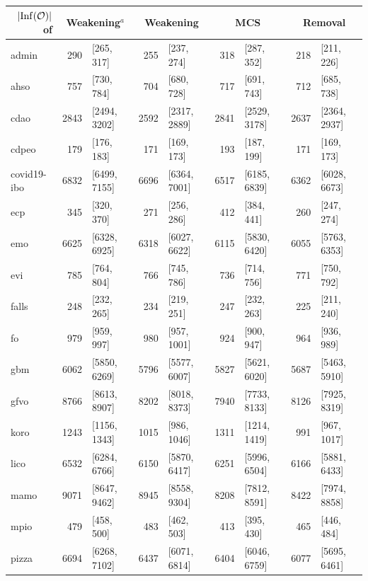 \begin{table}[htbp]
  \scriptsize
  \centering
  \begin{tabular}{|l|r@{ }lr@{ }lr@{ }lr@{ }l|}
    \cline{2-9}
    \multicolumn{1}{r|}{$|{\operatorname{Inf}}(\mathcal{O})|$ of} & \multicolumn{2}{c}{Weakening$^a$} & \multicolumn{2}{c}{Weakening} & \multicolumn{2}{c}{MCS} & \multicolumn{2}{c|}{Removal} \\
    \hline
    admin & 290 & [265, 317] & 255 & [237, 274] & 318 & [287, 352] & 218 & [211, 226] \\
    ahso & 757 & [730, 784] & 704 & [680, 728]& 717 & [691, 743] & 712 & [685, 738] \\
    cdao & 2843 & [2494, 3202] & 2592 & [2317, 2889] & 2841 & [2529, 3178] & 2637 & [2364, 2937] \\
    cdpeo & 179 & [176, 183] & 171 & [169, 173] & 193 & [187, 199] & 171 & [169, 173] \\
    covid19-ibo & 6832 & [6499, 7155] & 6696 & [6364, 7001] & 6517 & [6185, 6839] & 6362 & [6028, 6673] \\
    ecp & 345 & [320, 370] & 271 & [256, 286] & 412 & [384, 441] & 260 & [247, 274] \\
    emo & 6625 & [6328, 6925] & 6318 & [6027, 6622] & 6115 & [5830, 6420] & 6055 & [5763, 6353] \\
    evi & 785 & [764, 804] & 766 & [745, 786] & 736 & [714, 756] & 771 & [750, 792] \\
    falls & 248 & [232, 265] & 234 & [219, 251] & 247 & [232, 263] & 225 & [211, 240] \\
    fo & 979 & [959, 997] & 980 & [957, 1001] & 924 & [900, 947] & 964 & [936, 989] \\
    gbm & 6062 & [5850, 6269] & 5796 & [5577, 6007] & 5827 & [5621, 6020] & 5687 & [5463, 5910] \\
    gfvo & 8766 & [8613, 8907] & 8202 & [8018, 8373] & 7940 & [7733, 8133] & 8126 & [7925, 8319] \\
    koro & 1243 & [1156, 1343] & 1015 & [986, 1046] & 1311 & [1214, 1419] & 991 & [967, 1017] \\
    lico & 6532 & [6284, 6766] & 6150 & [5870, 6417] & 6251 & [5996, 6504] & 6166 & [5881, 6433] \\
    mamo & 9071 & [8647, 9462] & 8945 & [8558, 9304] & 8208 & [7812, 8591] & 8422 & [7974, 8858] \\
    mpio & 479 & [458, 500] & 483 & [462, 503] & 413 & [395, 430] & 465 & [446, 484] \\
    pizza & 6694 & [6268, 7102] & 6437 & [6071, 6814] & 6404 & [6046, 6759] & 6077 & [5695, 6461] \\

\end{tabular}
\end{table}
